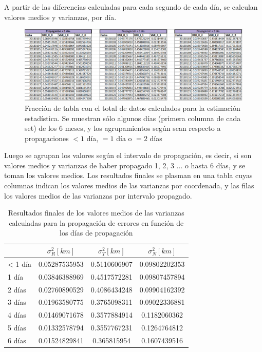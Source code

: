 {A partir de las diferencias calculadas para cada segundo de cada d\'ia, se calculan valores medios y varianzas, por d\'ia.\\


\begin{figure}[!h]
\centering
\includegraphics[width=\textwidth]{imagenes/tablacompleta}
\caption[Tabla de Estimaci\'on de errores.]{Fracci\'on de tabla con el total de datos calculados para la estimaci\'on estad\'istica. Se muestran s\'olo algunos d\'ias (primera columna de cada set) de los 6 meses, y los agrupamientos seg\'un sean respecto a propagaciones $< 1$ d\'ia, $= 1$ d\'ia o $= 2$ d\'ias}
\label{fig:tablacompleta}
\end{figure}

Luego se agrupan los valores seg\'un el intervalo de propagaci\'on, es decir, si son valores medios y varianzas de haber propagado 1, 2, 3 ... o hasta 6 d\'ias, y se toman los valores medios. Los resultados finales se plasman en una tabla cuyas columnas indican los valores medios de las varianzas por coordenada, y las filas los valores medios de las varianzas por intervalo propagado.\\

\begin{table}[!h]
\centering
\caption[Tabla con los valores medios para la propagaci\'on de errores.]{Resultados finales de los valores medios de las varianzas calculadas para la propagaci\'on de errores en funci\'on de los d\'ias de propagaci\'on}
\begin{tabular}{|l|c|c|c|}
\hline \hline
\rowcolor{yellow!35}
&$\sigma^{2}_R [km]$ &$\sigma^{2}_T [km]$ &$\sigma^{2}_N [km]$\\
\hline \hline
< 1 d\'ia & 0.05287535953&0.5110606907&0.09802202353\\
\hline
1 d\'ia & 0.03846388969&0.4517572281&0.09807457894\\
\hline
2 d\'ias & 0.02760890529&0.4086434248&0.09904162392\\
\hline
3 d\'ias & 0.01963580775&0.3765098311&0.09022336881\\
\hline
4 d\'ias & 0.01469071678&0.3577884914&0.1182060362\\
\hline
5 d\'ias & 0.01332578794&0.3557767231&0.1264764812\\
\hline
6 d\'ias & 0.01524829841&0.365815954&0.1607439516\\
\hline
\end{tabular}
\label{tab:resultatabla}
\end{table}

}
